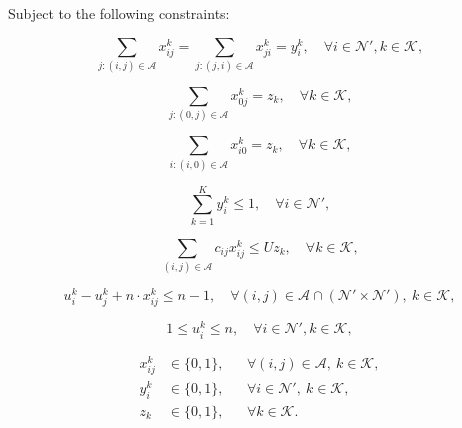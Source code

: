 \documentclass[preprint,12pt,authoryear]{elsarticle}
\theoremstyle{definition}
\begin{document}
\noindent Subject to the following constraints:

\begin{equation}
\sum_{j:(i,j)\in\mathcal{A}}x_{ij}^k=\sum_{j:(j,i)\in\mathcal{A}}x_{ji}^k=y_i^k, \quad \forall i \in \mathcal{N'}, k \in \mathcal{K},
\label{equ2}
\end{equation}

\begin{equation}
\sum_{j:(0,j)\in\mathcal{A}}x_{0j}^k=z_k, \quad \forall k \in \mathcal{K},
\label{equ3}
\end{equation}

\begin{equation}
\sum_{i:(i,0)\in\mathcal{A}}x_{i0}^k=z_k, \quad \forall k \in \mathcal{K},
\label{equ4}
\end{equation}

\begin{equation}
\sum_{k=1}^K y_i^k \leq 1, \quad \forall i \in \mathcal{N'},
\label{equ5}
\end{equation}

\begin{equation}
\sum_{(i,j)\in\mathcal{A}}c_{ij}x_{ij}^k\leq Uz_k, \quad \forall k \in \mathcal{K},
\label{equ6}
\end{equation}

\begin{equation}
u_i^k - u_j^k + n \cdot x_{ij}^k \leq n-1, \quad \forall (i,j)\in\mathcal{A}\cap(\mathcal{N}'\times\mathcal{N}'),\ k\in\mathcal{K},
\label{equ7}
\end{equation}

\begin{equation}
1 \leq u_i^k \leq n, \quad \forall i \in \mathcal{N'}, k \in \mathcal{K},
\label{equ8}
\end{equation}

\begin{equation}
\begin{aligned}
x_{ij}^k&\in\{0,1\}, &&\forall (i,j)\in\mathcal{A},\ k\in\mathcal{K},\\
y_i^k&\in\{0,1\}, &&\forall i\in\mathcal{N}',\ k\in\mathcal{K},\\
z_k&\in\{0,1\}, &&\forall k\in\mathcal{K}.
\end{aligned}
\label{equ9}
\end{equation} 
\end{document}
